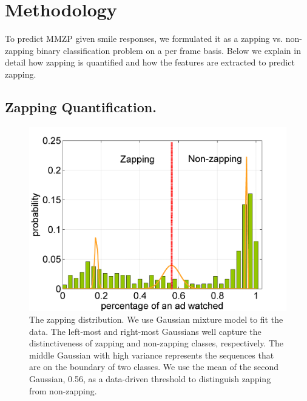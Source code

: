 \documentclass[twoside,leqno,twocolumn]{article}
\begin{document}
\section{Methodology}%
To predict MMZP given smile responses, we formulated it as a zapping vs. non-zapping binary classification problem on a per frame basis. Below we explain in detail how zapping is quantified and how the features are extracted to predict zapping.


\subsection{Zapping Quantification.}

\begin{figure}[h]
	\centering
		\includegraphics[width=.85\columnwidth]{fig/ad_len_distr.png}
	\caption{The zapping distribution. We use Gaussian mixture model to fit the data. The left-most and right-most Gaussians well capture the distinctiveness of zapping and non-zapping classes, respectively. The middle Gaussian with high variance represents the sequences that are on the boundary of two classes. We use the mean of the second Gaussian, 0.56, as a data-driven threshold to distinguish zapping from non-zapping.}
	\label{fig:ad_len_distr}
\end{figure}
\end{document}
